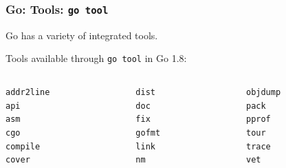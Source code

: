 \begin{frame}[t]
  \frametitle{Go: Tools: \texttt{go tool}}

  Go has a variety of integrated tools.

  \vspace{\baselineskip}
  Tools available through \texttt{go tool} in Go 1.8:

  \begin{center}
    \begin{columns}[T]
      \begin{column}{0.15\linewidth}
        \texttt{addr2line} \\
        \texttt{api} \\
        \texttt{asm} \\
        \texttt{cgo} \\
        \texttt{compile} \\
        \texttt{cover}
      \end{column}
      \begin{column}{0.15\linewidth}
        \texttt{dist} \\
        \texttt{doc} \\
        \texttt{fix} \\
        \texttt{gofmt} \\
        \texttt{link} \\
        \texttt{nm}
      \end{column}
      \begin{column}{0.15\linewidth}
        \texttt{objdump} \\
        \texttt{pack} \\
        \texttt{pprof} \\
        \texttt{tour} \\
        \texttt{trace} \\
        \texttt{vet}
      \end{column}
    \end{columns}
  \end{center}


\end{frame}
